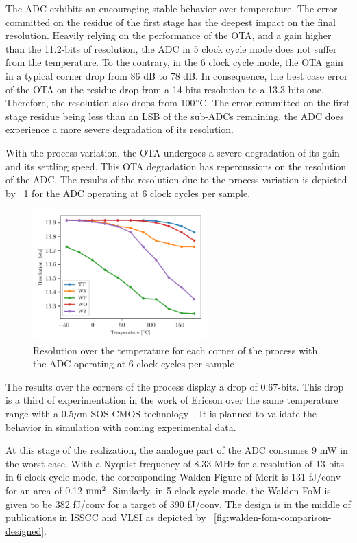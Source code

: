 The ADC exhibits an encouraging stable behavior over temperature. The error committed on the residue of the first stage has the deepest impact on the final resolution. Heavily relying on the performance of the OTA, and a gain higher than the 11.2-bits of resolution, the ADC in 5 clock cycle mode does not suffer from the temperature. To the contrary, in the 6 clock cycle mode, the OTA gain in a typical corner drop from 86 dB to 78 dB. In consequence, the best case error of the OTA on the residue drop from a 14-bits resolution to a 13.3-bits one. Therefore, the resolution also drops from 100$\degree$C. The error committed on the first stage residue being less than an LSB of the sub-ADCs remaining, the ADC does experience a more severe degradation of its resolution.

With the process variation, the OTA undergoes a severe degradation of its gain and its settling speed. This OTA degradation has repercussions on the resolution of the ADC. The results of the resolution due to the process variation is depicted by \figurename~\ref{fig:adc-res-schematic-temp-corners} for the ADC operating at 6 clock cycles per sample.

\begin{figure}[htp]
    \centering
    \includegraphics[width=0.6\textwidth]{Chapter5/Figs/preliminary/adc_real_ota_osr6_temp-corners.pdf}
    \caption{Resolution over the temperature for each corner of the process with the ADC operating at 6 clock cycles per sample}
    \label{fig:adc-res-schematic-temp-corners}
\end{figure}

The results over the corners of the process display a drop of 0.67-bits. This drop is a third of experimentation in the work of Ericson over the same temperature range with a 0.5$\mu$m SOS-CMOS technology~\cite{Ericson2004}. It is planned to validate the behavior in simulation with coming experimental data.

At this stage of the realization, the analogue part of the ADC consumes 9 mW in the worst case. With a Nyquist frequency of 8.33 MHz for a resolution of 13-bits in 6 clock cycle mode, the corresponding Walden Figure of Merit is 131 fJ/conv for an area of 0.12 $\rm mm^2$. Similarly, in 5 clock cycle mode, the Walden FoM is given to be 382 fJ/conv for a target of 390 fJ/conv. The design is in the middle of publications in ISSCC and VLSI as depicted by \figurename~\ref{fig:walden-fom-comparison-designed}.


